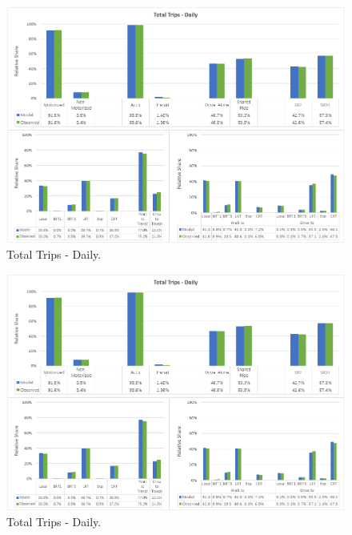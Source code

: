 \documentclass[
  letterpaper,
  DIV=11,
  numbers=noendperiod]{scrreprt}
\begin{document}
\begin{figure}[H]

{\centering \includegraphics{v9x/v900/validation/_pictures/6-plot2.png}

}

\caption{\label{fig-pdf-trips-dy}Total Trips - Daily.}

\end{figure}

\begin{figure}[H]

{\centering \includegraphics{v9x/v900/validation/_pictures/6-plot2.png}

}

\caption{\label{fig-pdf-trips-pk}Total Trips - Daily.}

\end{figure}
\end{document}
